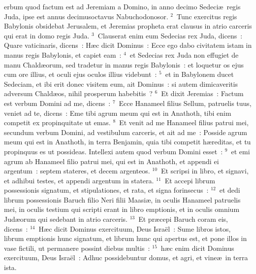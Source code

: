 \bchapter
{}erbum quod factum est ad Jeremiam a Domino, in anno decimo Sedeci\ae\ regis Juda, ipse est annus decimusoctavus Nabuchodonosor.
${}^{2}$~Tunc exercitus regis Babylonis obsidebat Jerusalem, et Jeremias propheta erat clausus in atrio carceris qui erat in domo regis Juda.
${}^{3}$~Clauserat enim eum Sedecias rex Juda, dicens~: Quare vaticinaris, dicens~: H\ae c dicit Dominus~: Ecce ego dabo civitatem istam in manus regis Babylonis, et capiet eam~:
${}^{4}$~et Sedecias rex Juda non effugiet de manu Chald\ae orum, sed tradetur in manus regis Babylonis~: et loquetur os ejus cum ore illius, et oculi ejus oculos illius videbunt~:
${}^{5}$~et in Babylonem ducet Sedeciam, et ibi erit donec visitem eum, ait Dominus~: si autem dimicaveritis adversum Chald\ae os, nihil prosperum habebitis~?
${}^{6}$~Et dixit Jeremias~: Factum est verbum Domini ad me, dicens~:
${}^{7}$~Ecce Hanameel filius Sellum, patruelis tuus, veniet ad te, dicens~: Eme tibi agrum meum qui est in Anathoth, tibi enim competit ex propinquitate ut emas.
${}^{8}$~Et venit ad me Hanameel filius patrui mei, secundum verbum Domini, ad vestibulum carceris, et ait ad me~: Posside agrum meum qui est in Anathoth, in terra Benjamin, quia tibi competit h\ae reditas, et tu propinquus es ut possideas. Intellexi autem quod verbum Domini esset~:
${}^{9}$~et emi agrum ab Hanameel filio patrui mei, qui est in Anathoth, et appendi ei argentum~: septem stateres, et decem argenteos.
${}^{10}$~Et scripsi in libro, et signavi, et adhibui testes, et appendi argentum in statera.
${}^{11}$~Et accepi librum possessionis signatum, et stipulationes, et rata, et signa forinsecus~:
${}^{12}$~et dedi librum possessionis Baruch filio Neri filii Maasi\ae , in oculis Hanameel patruelis mei, in oculis testium qui scripti erant in libro emptionis, et in oculis omnium Jud\ae orum qui sedebant in atrio carceris.
${}^{13}$~Et pr\ae cepi Baruch coram eis, dicens~:
${}^{14}$~H\ae c dicit Dominus exercituum, Deus Isra\"el~: Sume libros istos, librum emptionis hunc signatum, et librum hunc qui apertus est, et pone illos in vase fictili, ut permanere possint diebus multis~:
${}^{15}$~h\ae c enim dicit Dominus exercituum, Deus Isra\"el~: Adhuc possidebuntur domus, et agri, et vine\ae\ in terra ista.


